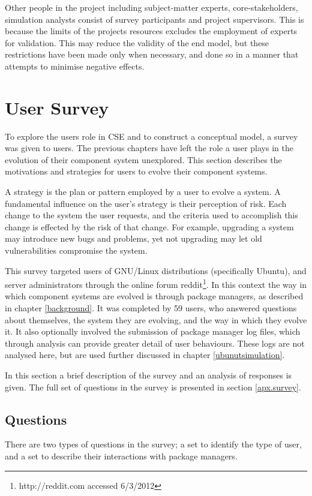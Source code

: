 Other people in the project including subject-matter experts, core-stakeholders, simulation analysts consist of survey participants and project supervisors.
This is because the limits of the projects resources excludes the employment of experts for validation.
This may reduce the validity of the end model, but these restrictions have been made only when necessary,
and done so in a manner that attempts to minimise negative effects.


\section{User Survey}
\label{strat.usersurvey}
To explore the users role in CSE and to construct a conceptual model, a survey was given to users.
The previous chapters have left the role a user plays in the evolution of their component system unexplored.
This section describes the motivations and strategies for users to evolve their component systems.

A strategy is the plan or pattern employed by a user to evolve a system.
A fundamental influence on the user's strategy is their perception of risk.
Each change to the system the user requests, and the criteria used to accomplish this change is effected by the risk of that change.
For example, upgrading a system may introduce new bugs and problems, yet not upgrading may let old vulnerabilities compromise the system.

This survey targeted users of GNU/Linux distributions (specifically Ubuntu), and server administrators through the online forum reddit\footnote{http://reddit.com accessed 6/3/2012}.
In this context the way in which component systems are evolved is through package managers, as described in chapter \ref{background}.
It was completed by 59 users, who answered questions about themselves, the system they are evolving, and the way in which they evolve it.
It also optionally involved the submission of package manager log files, which through analysis can provide greater detail of user behaviours.
These logs are not analysed here, but are used further discussed in chapter \ref{ubunutsimulation}.

In this section a brief description of the survey and an analysis of responses is given.
The full set of questions in the survey is presented in section \ref{apx.survey}. 

\subsection{Questions}
There are two types of questions in the survey; a set to identify the type of user, and a set to describe their interactions with package managers.

